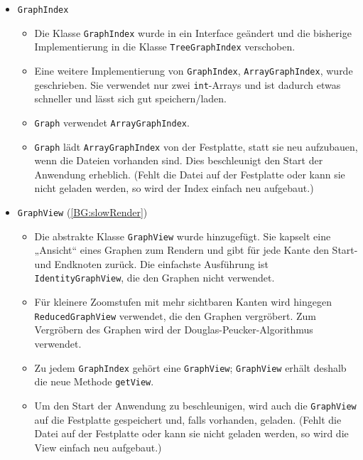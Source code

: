 \documentclass[a4paper, 11pt]{article}
\newcommand{\code}[1]{\texttt{#1}}
\begin{document}
\begin{itemize}
\item \code{GraphIndex}
  \begin{itemize}
  \item Die Klasse \code{GraphIndex} wurde in ein Interface geändert und die bisherige Implementierung in die Klasse \code{TreeGraphIndex} verschoben.
  \item Eine weitere Implementierung von \code{GraphIndex}, \code{ArrayGraphIndex}, wurde geschrieben.
  Sie verwendet nur zwei \code{int}-Arrays und ist dadurch etwas schneller und lässt sich gut speichern/laden.
  \item \code{Graph} verwendet \code{ArrayGraphIndex}.
  \item \code{Graph} lädt \code{ArrayGraphIndex} von der Festplatte, statt sie neu aufzubauen, wenn die Dateien vorhanden sind.
    Dies beschleunigt den Start der Anwendung erheblich.
    (Fehlt die Datei auf der Festplatte oder kann sie nicht geladen werden, so wird der Index einfach neu aufgebaut.)
  \end{itemize}
\item\label{change:graphView} \code{GraphView} (\ref{BG:slowRender})
  \begin{itemize}
  \item Die abstrakte Klasse \code{GraphView} wurde hinzugefügt.
    Sie kapselt eine „Ansicht“ eines Graphen zum Rendern und gibt für jede Kante den Start- und Endknoten zurück.
    Die einfachste Ausführung ist \code{IdentityGraphView}, die den Graphen nicht verwendet.
  \item Für kleinere Zoomstufen mit mehr sichtbaren Kanten wird hingegen \code{ReducedGraphView} verwendet, die den Graphen vergröbert.
    Zum Vergröbern des Graphen wird der Douglas-Peucker-Algorithmus verwendet. %
  \item Zu jedem \code{GraphIndex} gehört eine \code{GraphView};
    \code{GraphView} erhält deshalb die neue Methode \code{getView}.
  \item Um den Start der Anwendung zu beschleunigen, wird auch die \code{GraphView} auf die Festplatte gespeichert und, falls vorhanden, geladen.
    (Fehlt die Datei auf der Festplatte oder kann sie nicht geladen werden, so wird die View einfach neu aufgebaut.)
  \end{itemize}
  

\end{itemize}
\end{document}
